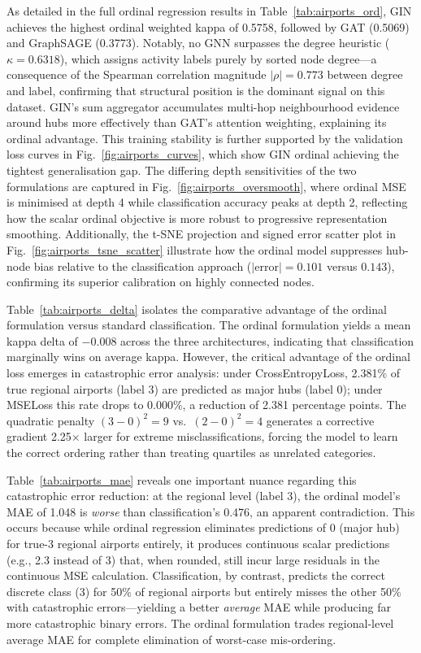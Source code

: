 \documentclass[conference]{IEEEtran}
\begin{document}
As detailed in the full ordinal regression results in Table~\ref{tab:airports_ord}, GIN achieves the highest ordinal weighted kappa of 0.5758, followed by GAT (0.5069) and GraphSAGE (0.3773). Notably, no GNN surpasses the degree heuristic ($\kappa = 0.6318$), which assigns activity labels purely by sorted node degree---a consequence of the Spearman correlation magnitude $|\rho|=0.773$ between degree and label, confirming that structural position is the dominant signal on this dataset. GIN's sum aggregator accumulates multi-hop neighbourhood evidence around hubs more effectively than GAT's attention weighting, explaining its ordinal advantage. This training stability is further supported by the validation loss curves in Fig.~\ref{fig:airports_curves}, which show GIN ordinal achieving the tightest generalisation gap. The differing depth sensitivities of the two formulations are captured in Fig.~\ref{fig:airports_oversmooth}, where ordinal MSE is minimised at depth 4 while classification accuracy peaks at depth 2, reflecting how the scalar ordinal objective is more robust to progressive representation smoothing. Additionally, the t-SNE projection and signed error scatter plot in Fig.~\ref{fig:airports_tsne_scatter} illustrate how the ordinal model suppresses hub-node bias relative to the classification approach ($|$error$|=0.101$ versus $0.143$), confirming its superior calibration on highly connected nodes.

Table~\ref{tab:airports_delta} isolates the comparative advantage of the ordinal formulation versus standard classification. The ordinal formulation yields a mean kappa delta of $-0.008$ across the three architectures, indicating that classification marginally wins on average kappa. However, the critical advantage of the ordinal loss emerges in catastrophic error analysis: under CrossEntropyLoss, 2.381\% of true regional airports (label 3) are predicted as major hubs (label 0); under MSELoss this rate drops to 0.000\%, a reduction of 2.381 percentage points. The quadratic penalty $(3-0)^2 = 9$ vs.\ $(2-0)^2 = 4$ generates a corrective gradient 2.25$\times$ larger for extreme misclassifications, forcing the model to learn the correct ordering rather than treating quartiles as unrelated categories.

Table~\ref{tab:airports_mae} reveals one important nuance regarding this catastrophic error reduction: at the regional level (label 3), the ordinal model's MAE of 1.048 is \emph{worse} than classification's 0.476, an apparent contradiction. This occurs because while ordinal regression eliminates predictions of 0 (major hub) for true-3 regional airports entirely, it produces continuous scalar predictions (e.g., 2.3 instead of 3) that, when rounded, still incur large residuals in the continuous MSE calculation. Classification, by contrast, predicts the correct discrete class (3) for 50\% of regional airports but entirely misses the other 50\% with catastrophic errors---yielding a better \emph{average} MAE while producing far more catastrophic binary errors. The ordinal formulation trades regional-level average MAE for complete elimination of worst-case mis-ordering.
\end{document}
